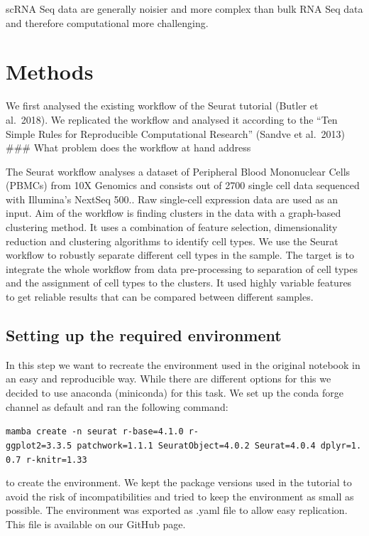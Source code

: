 \documentclass[a4paper, 10pt]{scrartcl}
\begin{document}
scRNA Seq data are generally noisier and more complex than bulk RNA Seq
data and therefore computational more challenging.

\hypertarget{methods}{%
\section{Methods}\label{methods}}

We first analysed the existing workflow of the Seurat tutorial (Butler
et al.~2018). We replicated the workflow and analysed it according to
the ``Ten Simple Rules for Reproducible Computational Research'' (Sandve
et al.~2013) \#\#\# What problem does the workflow at hand address

The Seurat workflow analyses a dataset of Peripheral Blood Mononuclear
Cells (PBMCs) from 10X Genomics and consists out of 2700 single cell
data sequenced with Illumina's NextSeq 500.. Raw single-cell expression
data are used as an input. Aim of the workflow is finding clusters in
the data with a graph-based clustering method. It uses a combination of
feature selection, dimensionality reduction and clustering algorithms to
identify cell types. We use the Seurat workflow to robustly separate
different cell types in the sample. The target is to integrate the whole
workflow from data pre-processing to separation of cell types and the
assignment of cell types to the clusters. It used highly variable
features to get reliable results that can be compared between different
samples.

\hypertarget{setting-up-the-required-environment}{%
\subsection{Setting up the required
environment}\label{setting-up-the-required-environment}}

In this step we want to recreate the environment used in the original
notebook in an easy and reproducible way. While there are different
options for this we decided to use anaconda (miniconda) for this task.
We set up the conda forge channel as default and ran the following
command:

\texttt{mamba\ create\ -n\ seurat\ r-base=4.1.0\ r-ggplot2=3.3.5\ patchwork=1.1.1\ SeuratObject=4.0.2\ Seurat=4.0.4\ dplyr=1.0.7\ r-knitr=1.33}

to create the environment. We kept the package versions used in the
tutorial to avoid the risk of incompatibilities and tried to keep the
environment as small as possible. The environment was exported as .yaml
file to allow easy replication. This file is available on our GitHub
page.
\end{document}
